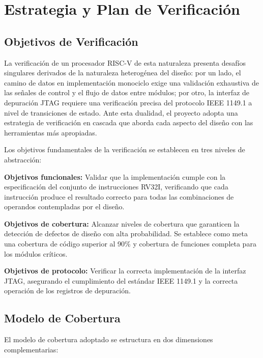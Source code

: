 

\label{chp:Verificacion}

\section{Estrategia y Plan de Verificación}
\label{sec:VerifStrategy}

\subsection{Objetivos de Verificación}
\label{sec:VerifGoals}

La verificación de un procesador RISC-V de esta naturaleza presenta desafíos singulares derivados de la naturaleza heterogénea del diseño: por un lado, el camino de datos en implementación monociclo exige una validación exhaustiva de las señales de control y el flujo de datos entre módulos; por otro, la interfaz de depuración JTAG requiere una verificación precisa del protocolo IEEE 1149.1 a nivel de transiciones de estado. Ante esta dualidad, el proyecto adopta una estrategia de verificación en cascada que aborda cada aspecto del diseño con las herramientas más apropiadas.

Los objetivos fundamentales de la verificación se establecen en tres niveles de abstracción:

\textbf{Objetivos funcionales:} Validar que la implementación cumple con la especificación del conjunto de instrucciones RV32I, verificando que cada instrucción produce el resultado correcto para todas las combinaciones de operandos contempladas por el diseño.

\textbf{Objetivos de cobertura:} Alcanzar niveles de cobertura que garanticen la detección de defectos de diseño con alta probabilidad. Se establece como meta una cobertura de código superior al 90\% y cobertura de funciones completa para los módulos críticos.

\textbf{Objetivos de protocolo:} Verificar la correcta implementación de la interfaz JTAG, asegurando el cumplimiento del estándar IEEE 1149.1 y la correcta operación de los registros de depuración.

\subsection{Modelo de Cobertura}
\label{sec:CoverageModel}

El modelo de cobertura adoptado se estructura en dos dimensiones complementarias:

